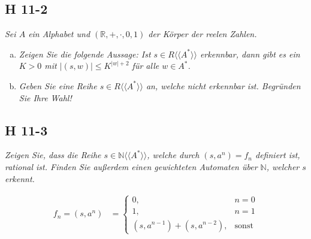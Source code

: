 \documentclass{scrartcl}
\begin{document}
\subsection{H 11-2}

\textsl{Sei $A$ ein Alphabet und $(\mathbb{R}, +, \cdot, 0, 1)$ der Körper der reelen Zahlen.}

\begin{enumerate}[(a)]
    \item \textsl{Zeigen Sie die folgende Aussage: Ist $s \in R\langle\langle A^* \rangle\rangle$ erkennbar, dann gibt es ein $K > 0$ mit $|(s, w)| \leq K^{|w|+2}$ für alle $w \in A^*$.}
    \item \textsl{Geben Sie eine Reihe $s \in R\langle\langle A^* \rangle\rangle$ an, welche nicht erkennbar ist. Begründen Sie Ihre Wahl!}
\end{enumerate}

\subsection{H 11-3}

\textsl{Zeigen Sie, dass die Reihe $s \in \mathbb{N}\langle\langle A^* \rangle\rangle$, welche durch $(s, a^n) = f_n$ definiert ist, rational ist. Finden Sie außerdem einen gewichteten Automaten über $\mathbb{N}$, welcher $s$ erkennt.}

\begin{align*}
  f_n = (s, a^n) &= \begin{cases}
    0, &n = 0\\%
    1, &n = 1\\%
    (s, a^{n-1}) + (s, a^{n-2}), &\text{sonst}
  \end{cases}
\end{align*}
\end{document}
